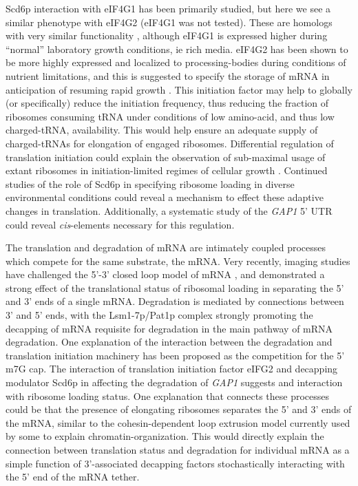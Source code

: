 Scd6p interaction with eIF4G1 has been primarily studied, 
but here we see a similar phenotype with eIF4G2 
(eIF4G1 was not tested). These are
homologs with very similar functionality
\parencite{clarkson2010functional}, 
although eIF4G1 is expressed higher
during “normal” laboratory growth conditions, ie rich media. 
eIF4G2 has been shown to be more highly expressed and localized to
processing-bodies during conditions of nutrient limitations, and
this is suggested to specify the storage of mRNA in anticipation of
resuming rapid growth \parencite{brengues2007accumulation}.
This initiation factor may help to globally (or specifically)
reduce the initiation frequency, thus reducing the fraction of
ribosomes consuming tRNA under conditions of low amino-acid,
and thus low charged-tRNA, availability.
This would help ensure an adequate
supply of charged-tRNAs for elongation of engaged ribosomes.
Differential regulation of 
translation initiation could explain the observation of sub-maximal
usage of extant ribosomes in initiation-limited regimes of cellular
growth \parencite{kafri2016cost,metzl2017principles}.
Continued studies of the role of Scd6p in specifying ribosome
loading in diverse environmental conditions could reveal a mechanism
to effect these adaptive changes in translation.
Additionally, a systematic study of the \textit{GAP1} 5' UTR could
reveal \textit{cis}-elements necessary for this regulation.

The translation and degradation of mRNA are intimately coupled
processes which compete for the same substrate, the mRNA. 
Very recently, imaging studies have challenged the 5'-3' closed loop
model of mRNA \parencite{adivarahan2017spatial}, and demonstrated
a strong effect of the translational status of ribosomal loading in 
separating the 5' and 3' ends of a single mRNA.
Degradation is mediated by connections between 3' and 5' ends, 
with the Lsm1-7p/Pat1p complex strongly promoting the decapping of
mRNA requisite for degradation in the main pathway of mRNA
degradation.
One explanation of the interaction between the degradation and
translation initiation machinery has been proposed as the competition
for the 5' m7G cap. 
The interaction of translation initiation factor eIFG2 and
decapping modulator Scd6p in affecting the degradation of
\textit{GAP1} suggests and interaction with ribosome loading status.
One explanation that connects these processes could be that the presence
of elongating ribosomes separates the 5' and 3' ends of the mRNA, 
similar to the cohesin-dependent loop extrusion model currently used 
by some to explain chromatin-organization. 
This would directly explain the connection between translation status
and degradation for individual mRNA as a simple function of 
3'-associated decapping factors stochastically interacting with 
the 5' end of the mRNA tether.

